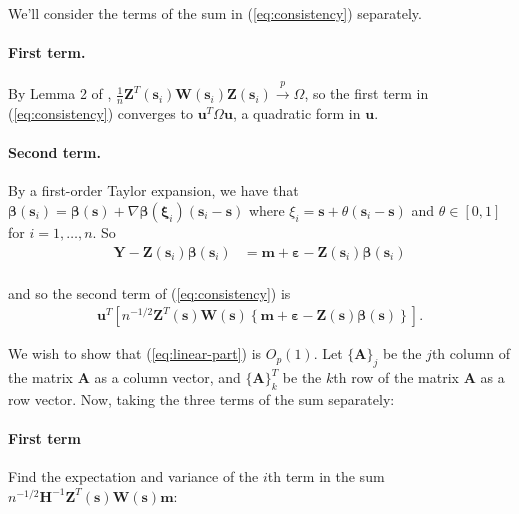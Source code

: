 \documentclass[authoryear, review, 11pt]{elsarticle}
\begin{document}
  We'll consider the terms of the sum in (\ref{eq:consistency}) separately.
  
  \paragraph{First term.} By Lemma 2 of \cite{Sun-Yan-Zhang-Lu-2014}, $\frac{1}{n} \bm{Z}^T(\bm{s}_i) \bm{W}(\bm{s}_i) \bm{Z}(\bm{s}_i) \xrightarrow{p} \Omega$, so the first term in (\ref{eq:consistency}) converges to $\bm{u}^T \Omega \bm{u}$, a quadratic form in $\bm{u}$.
  
  \paragraph{Second term.} By a first-order Taylor expansion, we have that $\bm{\beta}(\bm{s}_i) = \bm{\beta}(\bm{s}) + \nabla \bm{\beta}(\bm{\xi}_{i}) (\bm{s}_i - \bm{s})$ where $\xi_i = \bm{s} + \theta (\bm{s}_i - \bm{s})$ and $\theta \in [0, 1]$ for $i = 1, \dots, n$. So
  \begin{align*}
    \bm{Y} - \bm{Z}(\bm{s}_i) \bm{\beta}(\bm{s}_i) &= \bm{m} + \bm{\varepsilon} - \bm{Z}(\bm{s}_i) \bm{\beta}(\bm{s}_i) \\
  \end{align*}
  
  and so the second term of (\ref{eq:consistency}) is
  \begin{align}\label{eq:linear-part}
    \bm{u}^T \left[ n^{-1/2} \bm{Z}^T(\bm{s}) \bm{W}(\bm{s}) \left\{ \bm{m} + \bm{\varepsilon} - \bm{Z}(\bm{s}) \bm{\beta}(\bm{s})  \right\} \right].
  \end{align}
  
  We wish to show that (\ref{eq:linear-part}) is $O_p(1)$. Let $\{ \bm{A} \}_j$ be the $j$th column of the matrix $\bm{A}$ as a column vector, and $\{ \bm{A} \}_k^T$ be the $k$th row of the matrix $\bm{A}$ as a row vector. Now, taking the three terms of the sum separately:
  
  \paragraph{First term}
    Find the expectation and variance of the $i$th term in the sum $n^{-1/2} \bm{H}^{-1} \bm{Z}^T(\bm{s}) \bm{W}(\bm{s}) \bm{m}$:
\end{document}
